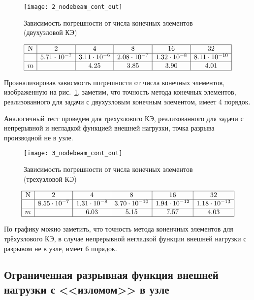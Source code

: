 \documentclass[12pt,a4paper]{article}
\begin{document}
\begin{figure}[H]
		\centering
		\texttt{[image: 2\_nodebeam\_cont\_out]}
		\caption{Зависимость погрешности от числа конечных элементов (двухузловой КЭ)}
		\label{fig:2_nodebeam_cont_out}
	\end{figure}


\[
\begin{array}{|c|c|c|c|c|c|}
\hline
\text{N} & 2 & 4 & 8 & 16 & 32 \\ \hline
\Delta  & 5.71 \cdot 10^{-7} & 3.11 \cdot 10^{-6} & 2.08 \cdot 10^{-7} & 1.32 \cdot 10^{-8} & 8.11 \cdot 10^{-10}\\ \hline
m  &  &4.25 & 3.85 & 3.90 & 4.01 \\ 
\hline
\end{array}
\]

Проанализировав зависмость погрешности от числа конечных элементов, изображенную на рис.~\ref{fig:2_nodebeam_cont_out}, заметим, что точность метода конечных элементов, реализованного для задачи с двухузловым конечным элементом, имеет 4 порядок. 


Аналогичный тест проведем для трехузлового КЭ, реализованного для задачи с непрерывной и негладкой функцией внешней нагрузки, точка разрыва производной не в узле.  
\begin{figure}[H]
		\centering
		\texttt{[image: 3\_nodebeam\_cont\_out]}
		\caption{Зависимость погрешности от числа конечных элементов (трехузловой КЭ)}
		\label{3_nodebeam_cont_out}
	\end{figure}


\[
\begin{array}{|c|c|c|c|c|c|}
\hline
\text{N} & 2 & 4 & 8 & 16 & 32 \\ \hline
\Delta  & 8.55 \cdot 10^{-7} & 1.31 \cdot 10^{-8} & 3.70 \cdot 10^{-10} & 1.94 \cdot 10^{-12} & 1.18 \cdot 10^{-13}  \\ \hline
m  & & 6.03 & 5.15 & 7.57 & 4.03 \text{} \\ 
\hline
\end{array}
\]

По графику можно заметить, что точность метода коненчных элементов для трёхузлового КЭ, в случае непрерывной негладкой функции внешней нагрузки с разрывом не в узле, имеет 6 порядок.\\





\subsection[Ограниченная функция внешней нагрузки с <<изломом>> в узле]{Ограниченная разрывная функция внешней нагрузки с <<изломом>> в узле}
\end{document}
